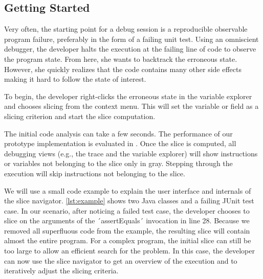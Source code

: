 ﻿\documentclass[
      english,
      ]{llncs}
\begin{document}

\subsection{Getting Started}

Very often, the starting point for a debug session is a reproducible observable program failure, preferably in the form of a failing unit test.
Using an omniscient debugger, the developer halts the execution at the failing line of code to observe the program state.
From here, she wants to backtrack the erroneous state.
However, she quickly realizes that the code contains many other side effects making it hard to follow the state of interest.
 

To begin, the developer right-clicks the erroneous state in the variable explorer and chooses slicing from the context menu.
This will set the variable or field as a slicing criterion and start the slice computation.

The initial code analysis can take a few seconds.
The performance of our prototype implementation is evaluated in  .
Once the slice is computed, all debugging views (e.g., the trace and the variable explorer) will show instructions or variables not belonging to the slice only in gray.
Stepping through the execution will skip instructions not belonging to the slice.

We will use a small code example to explain the user interface and internals of the slice navigator. 
\autoref{lst:example} shows two Java classes and a failing JUnit test case.
In our scenario, after noticing a failed test case, the developer chooses to slice on the arguments of the ´assertEquals´ invocation in line 28.
Because we removed all superfluous code from the example, the resulting slice will contain almost the entire program.
For a complex program, the initial slice can still be too large to allow an efficient search for the problem.
In this case, the developer can now use the slice navigator to get an overview of the execution and to iteratively adjust the slicing criteria.
\end{document}
